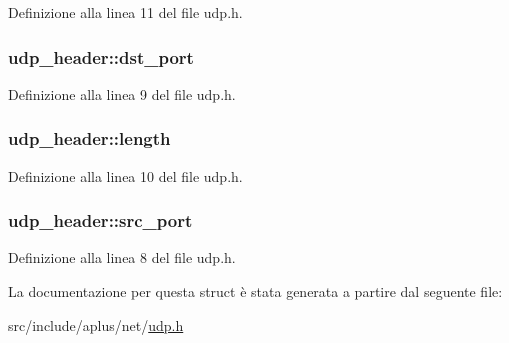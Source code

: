 Definizione alla linea 11 del file udp.\+h.

\hypertarget{structudp__header_a0cabb64601f3523a8defb137a90da96a}{
\subsubsection[{dst\+\_\+port}]{ udp\+\_\+header\+::dst\+\_\+port}}\label{structudp__header_a0cabb64601f3523a8defb137a90da96a}


Definizione alla linea 9 del file udp.\+h.

\hypertarget{structudp__header_a8129128b23a79dad769fc422f7b1c12b}{
\subsubsection[{length}]{ udp\+\_\+header\+::length}}\label{structudp__header_a8129128b23a79dad769fc422f7b1c12b}


Definizione alla linea 10 del file udp.\+h.

\hypertarget{structudp__header_ac0f7a492b8b7dd8e425d6517c7e9b3c2}{
\subsubsection[{src\+\_\+port}]{ udp\+\_\+header\+::src\+\_\+port}}\label{structudp__header_ac0f7a492b8b7dd8e425d6517c7e9b3c2}


Definizione alla linea 8 del file udp.\+h.



La documentazione per questa struct è stata generata a partire dal seguente file\+:\begin{DoxyCompactItemize}
\item 
src/include/aplus/net/\hyperlink{udp_8h}{udp.\+h}\end{DoxyCompactItemize}
